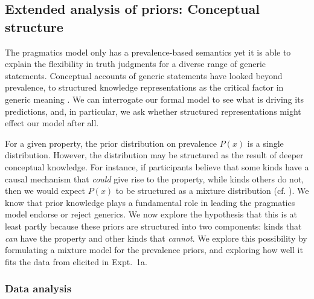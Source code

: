 \documentclass[12pt,letterpaper]{article}
\begin{document}
\subsection*{Extended analysis of priors: Conceptual structure}

The pragmatics model only has a prevalence-based semantics yet it is able to explain the flexibility in truth judgments for a diverse range of generic statements.
Conceptual accounts of generic statements have looked beyond prevalence, to structured knowledge representations as the critical factor in generic meaning \cite{Leslie2007, Prasada2013}. 
We can interrogate our formal model to see what is driving its predictions, and, in particular, we ask whether structured representations might effect our model after all.

For a given property,  the prior distribution on prevalence $P(x)$ is a single distribution.
However, the distribution may be structured as the result of deeper conceptual knowledge. 
For instance, if participants believe that some kinds have a causal mechanism that \emph{could} give rise to the property, while kinds others do not, then we would expect $P(x)$ to be structured as a mixture distribution (cf. ).
We know that prior knowledge plays a fundamental role in leading the pragmatics model endorse or reject generics. 
We now explore the hypothesis that this is at least partly because these priors are structured into two components: kinds that \emph{can} have the property and other kinds that \emph{cannot}.
We explore this possibility by formulating a mixture model for the prevalence priors, and exploring how well it fits the data from elicited in Expt.~1a.
%

\subsubsection*{Data analysis}
\end{document}
